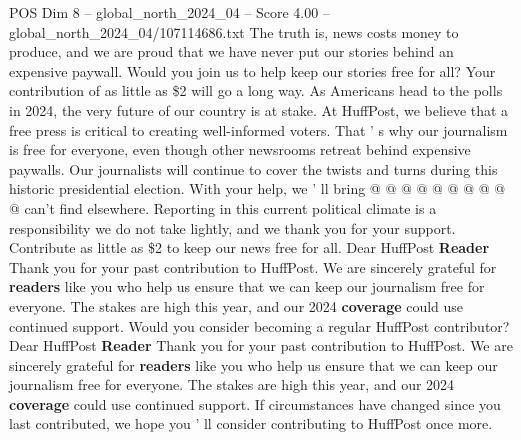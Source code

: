 \begin{textsample}{POS Dim 8 – global\_north\_2024\_04 – Score 4.00 – global\_north\_2024\_04/107114686.txt}
The truth is, news costs money to produce, and we are proud that we have never put our stories behind an expensive paywall.
Would you join us to help keep our stories free for all?
Your contribution of as little as \$2 will go a long way.
As Americans head to the polls in 2024, the very future of our country is at stake.
At HuffPost, we believe that a free press is critical to creating well-informed voters.
That ' s why our journalism is free for everyone, even though other newsrooms retreat behind expensive paywalls.
Our journalists will continue to cover the twists and turns during this historic presidential election.
With your help, we ' ll bring @ @ @ @ @ @ @ @ @ @ can't find elsewhere.
Reporting in this current political climate is a responsibility we do not take lightly, and we thank you for your support.
Contribute as little as \$2 to keep our news free for all.
Dear HuffPost \textbf{Reader} Thank you for your past contribution to HuffPost.
We are sincerely grateful for \textbf{readers} like you who help us ensure that we can keep our journalism free for everyone.
The stakes are high this year, and our 2024 \textbf{coverage} could use continued support.
Would you consider becoming a regular HuffPost contributor?
Dear HuffPost \textbf{Reader} Thank you for your past contribution to HuffPost.
We are sincerely grateful for \textbf{readers} like you who help us ensure that we can keep our journalism free for everyone.
The stakes are high this year, and our 2024 \textbf{coverage} could use continued support.
If circumstances have changed since you last contributed, we hope you ' ll consider contributing to HuffPost once more.

\end{textsample}
